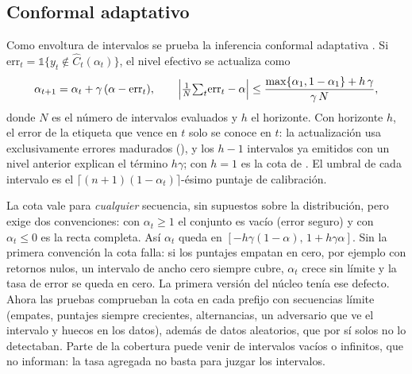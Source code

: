 

\subsection{Conformal adaptativo}\label{sec:conformal}

Como envoltura de intervalos se prueba la inferencia conformal adaptativa \citep{gibbs2021}. Si
$\mathrm{err}_t=\mathbb 1\{y_t\notin\widehat C_t(\alpha_t)\}$, el nivel efectivo se actualiza como
\begin{equation}
\alpha_{t+1}=\alpha_t+\gamma\,(\alpha-\mathrm{err}_t),
\qquad
\Bigl|\tfrac1N{\textstyle\sum_{t}}\mathrm{err}_t-\alpha\Bigr|\le\frac{\max\{\alpha_1,1-\alpha_1\}+h\,\gamma}{\gamma\,N},
\label{eq:aci}
\end{equation}
donde $N$ es el número de intervalos evaluados y $h$ el horizonte. Con horizonte $h$, el error de la
etiqueta que vence en $t$ solo se conoce en $t$: la actualización usa exclusivamente errores madurados
(), y los $h-1$ intervalos ya emitidos con un nivel anterior explican el término
$h\gamma$; con $h=1$ es la cota de \citet{gibbs2021}. El umbral de cada intervalo es el
$\lceil(n+1)(1-\alpha_t)\rceil$-ésimo puntaje de calibración.

La cota vale para \emph{cualquier} secuencia, sin supuestos sobre la distribución, pero exige dos
convenciones: con $\alpha_t\ge1$ el conjunto es vacío (error seguro) y con $\alpha_t\le0$ es la recta
completa. Así $\alpha_t$ queda en $[-h\gamma(1-\alpha),\,1+h\gamma\alpha]$. Sin la primera convención la
cota falla: si los puntajes empatan en cero, por ejemplo con retornos nulos, un intervalo de ancho cero
siempre cubre, $\alpha_t$ crece sin límite y la tasa de error se queda en cero. La primera versión del
núcleo tenía ese defecto. Ahora las pruebas comprueban la cota en cada prefijo con secuencias límite
(empates, puntajes siempre crecientes, alternancias, un adversario que ve el intervalo y huecos en los
datos), además de datos aleatorios, que por sí solos no lo detectaban. Parte de la cobertura puede venir
de intervalos vacíos o infinitos, que no informan: la tasa agregada no basta para juzgar los intervalos.

